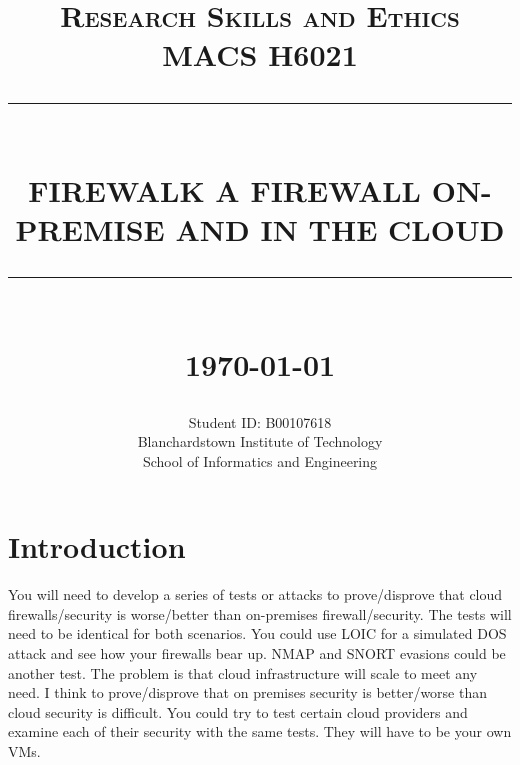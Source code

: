 \documentclass[12pt]{report}
\newcommand{\HRule}[1]{\rule{\linewidth}{#1}}
\begin{document}
\title{ \normalsize \textsc{Research Skills and Ethics MACS H6021}
		\\ [2.0cm]
		\HRule{0.5pt} \\
		\LARGE \textbf{\uppercase{Firewalk a Firewall On-Premise and in the Cloud}}
		\HRule{2pt} \\ [0.5cm]
		\normalsize \today \vspace*{5\baselineskip}}

\date{}

\author{
		Student ID: B00107618 \\ 
		Blanchardstown Institute of Technology \\
		School of Informatics and Engineering }

\maketitle
\tableofcontents
\newpage

\sectionfont{\scshape}


\section*{Introduction}
You will need to develop a series of tests or attacks to prove/disprove that cloud firewalls/security is
worse/better than on-premises firewall/security. The tests will need to be identical for both scenarios. 
\newline
You could use LOIC for a simulated DOS attack and see how your firewalls bear up. NMAP and SNORT evasions could be another test. 
\newline
The problem is that cloud infrastructure will scale to meet any need. I think to prove/disprove that on premises security is better/worse than cloud security is difficult. You could try to test certain cloud providers and examine each of their security with the same tests. 
\newline
They will have to be your own VMs.
\newline

\newpage
\end{document}
